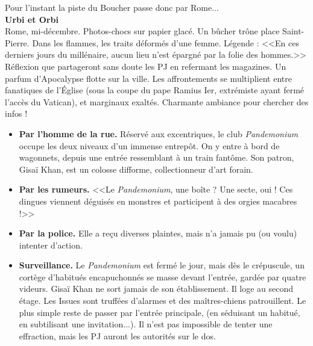 \documentclass[11pt,twoside,a4paper]{book}
\begin{document}
Pour l'instant la piste du Boucher passe donc par Rome...~\\

\textbf{\large Urbi et Orbi}~\\

Rome, mi-d{\'e}cembre. Photos-chocs sur papier glac{\'e}. Un b{\^u}cher tr{\^o}ne place Saint-Pierre. Dans les flammes, les traits d{\'e}form{\'e}s d'une femme. L{\'e}gende : <<En ces derniers jours du mill{\'e}naire, aucun lieu n'est {\'e}pargn{\'e} par la folie des hommes.>> R{\'e}flexion que partageront sans doute les PJ en refermant les magazines. Un parfum d'Apocalypse flotte sur la ville. Les affrontements se multiplient entre fanatiques de l'{\'E}glise (sous la coupe du pape Ramius Ier, extr{\'e}miste ayant ferm{\'e} l'acc{\`e}s du Vatican), et marginaux exalt{\'e}s. Charmante ambiance pour chercher des infos !~\\

\setlength\parindent{20pt}
\begin{itemize}
	\item \textbf{Par l'homme de la rue. }R{\'e}serv{\'e} aux excentriques, le club \textit{Pandemonium} occupe les deux niveaux d'un immense entrep{\^o}t. On y entre {\`a} bord de wagonnets, depuis une entr{\'e}e ressemblant {\`a} un train fant{\^o}me. Son patron, Gisa{\"i} Khan, est un colosse difforme, collectionneur d'art forain.
	\item \textbf{Par les rumeurs. }<<Le \textit{Pandemonium}, une bo{\^i}te ? Une secte, oui ! Ces dingues viennent d{\'e}guis{\'e}s en monstres et participent {\`a} des orgies macabres !>>
	\item \textbf{Par la police. }Elle a re\c{c}u diverses plaintes, mais n'a jamais pu (ou voulu) intenter d'action.
	\item \textbf{Surveillance. }Le \textit{Pandemonium} est ferm{\'e} le jour, mais d{\`e}s le cr{\'e}puscule, un cort{\`e}ge d'habitu{\'e}s encapuchonn{\'e}s se masse devant l'entr{\'e}e, gard{\'e}e par quatre videurs. Gisa{\"i} Khan ne sort jamais de son {\'e}tablissement. Il loge au second {\'e}tage. Les Issues sont truff{\'e}es d'alarmes et des ma{\^i}tres-chiens patrouillent. Le plus simple reste de passer par l'entr{\'e}e principale, (en s{\'e}duisant un habitu{\'e}, en subtilisant une invitation...). Il n'est pas impossible de tenter une effraction, mais les PJ auront les autorit{\'e}s sur le dos.
\end{itemize}~\\
\setlength\parindent{0pt}
\end{document}

